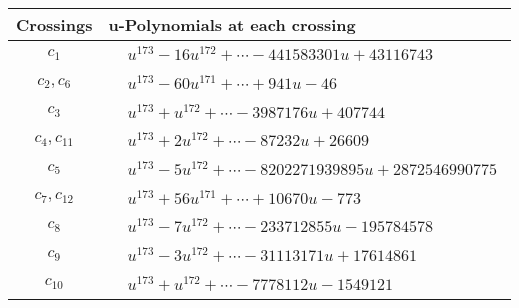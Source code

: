 \documentclass[1p]{elsarticle_modified}
\theoremstyle{definition}
\begin{document}
\begin{tabular}{m{50pt}|m{274pt}}
Crossings & \hspace{64pt}u-Polynomials at each crossing \\
\hline $$\begin{aligned}c_{1}\end{aligned}$$&$\begin{aligned}
&u^{173}-16 u^{172}+\cdots-441583301 u+43116743
\end{aligned}$\\
\hline $$\begin{aligned}c_{2},c_{6}\end{aligned}$$&$\begin{aligned}
&u^{173}-60 u^{171}+\cdots+941 u-46
\end{aligned}$\\
\hline $$\begin{aligned}c_{3}\end{aligned}$$&$\begin{aligned}
&u^{173}+u^{172}+\cdots-3987176 u+407744
\end{aligned}$\\
\hline $$\begin{aligned}c_{4},c_{11}\end{aligned}$$&$\begin{aligned}
&u^{173}+2 u^{172}+\cdots-87232 u+26609
\end{aligned}$\\
\hline $$\begin{aligned}c_{5}\end{aligned}$$&$\begin{aligned}
&u^{173}-5 u^{172}+\cdots-8202271939895 u+2872546990775
\end{aligned}$\\
\hline $$\begin{aligned}c_{7},c_{12}\end{aligned}$$&$\begin{aligned}
&u^{173}+56 u^{171}+\cdots+10670 u-773
\end{aligned}$\\
\hline $$\begin{aligned}c_{8}\end{aligned}$$&$\begin{aligned}
&u^{173}-7 u^{172}+\cdots-233712855 u-195784578
\end{aligned}$\\
\hline $$\begin{aligned}c_{9}\end{aligned}$$&$\begin{aligned}
&u^{173}-3 u^{172}+\cdots-31113171 u+17614861
\end{aligned}$\\
\hline $$\begin{aligned}c_{10}\end{aligned}$$&$\begin{aligned}
&u^{173}+u^{172}+\cdots-7778112 u-1549121
\end{aligned}$\\
\hline
\end{tabular}\\~\\
\end{document}
